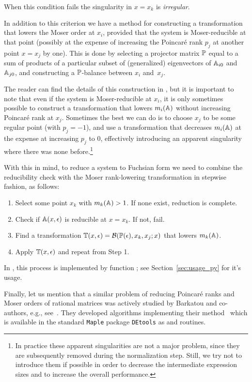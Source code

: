 \documentclass[12pt,a4paper]{article}
\begin{document}
When this condition fails the singularity in $x=x_k$ is {\em irregular}.

In addition to this criterion we have a method for constructing a transformation that lowers the Moser order at $x_i$, provided that the system is Moser-reducible at that point (possibly at the expense of increasing the Poincar\'e rank $p_j$ at another point $x=x_j$ by one).
This is done by selecting a projector matrix $\mathbb{P}$ equal to a sum of products of a particular subset of (generalized) eigenvectors of $\mathbb{A}_{i0}$ and $\mathbb{A}_{j0}$, and constructing a $\mathbb{P}$-balance between $x_i$ and~$x_j$.

The reader can find the details of this construction in \cite{Lee15}, but it is important to note that even if the system is Moser-reducible at $x_i$, it is only sometimes possible to construct a transformation that lowers $m_i(\mathbb{A})$ without increasing Poincar\'e rank at $x_j$.
Sometimes the best we can do is to choose $x_j$ to be some regular point (with $p_j=-1$), and use a transformation that decreases $m_i(\mathbb{A})$ at the expense at increasing $p_j$ to $0$, effectively introducing an apparent singularity where there was none before.\footnote{
    In practice these apparent singularities are not a major problem, since they are subsequently removed during the normalization step.
    Still, we try not to introduce them if possible in order to decrease the intermediate expression sizes and to increase the overall performance.
}

With this in mind, to reduce a system to Fuchsian form we need to combine the reducibility check with the Moser rank-lowering transformation in stepwise fashion, as follows:

\begin{enumerate}
    \item Select some point $x_k$ with $m_k(\mathbb{A}) > 1$. If none exist, reduction is complete.
    \item Check if $\mathbb{A}(x,\epsilon)$ is reducible at $x=x_k$. If not, fail.
    \item Find a transformation $\mathbb{T}(x,\epsilon) = \mathcal{B}(\mathbb{P}(\epsilon), x_k, x_j; x)$ that lowers $m_k(\mathbb{A})$.
    \item Apply $\mathbb{T}(x,\epsilon)$ and repeat from Step 1.
\end{enumerate}

In \fuchsia, this process is implemented by function ; see Section~\ref{sec:usage_py} for it's usage.

Finally, let us mention that a similar problem of reducing Poincar\'e ranks and Moser orders of rational matrices was actively studied by Barkatou and co-authors, e.g., see~\cite{BP99}.
They developed algorithms implementing their method~\cite{BP99} which is available in the standard \texttt{Maple} package \texttt{DEtools} as  and  routines.
\end{document}
